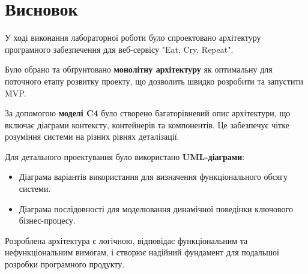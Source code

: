 \documentclass[12pt, a4paper]{article}
\begin{document}
\section{Висновок}

У ході виконання лабораторної роботи було спроектовано архітектуру програмного
забезпечення для веб-сервісу "Eat, Cry, Repeat".

Було обрано та обґрунтовано \textbf{монолітну архітектуру} як оптимальну для
поточного етапу розвитку проекту, що дозволить швидко розробити та запустити
MVP.

За допомогою \textbf{моделі C4} було створено багаторівневий опис архітектури,
що включає діаграми контексту, контейнерів та компонентів. Це забезпечує чітке
розуміння системи на різних рівнях деталізації.

Для детального проектування було використано \textbf{UML-діаграми}:
\begin{itemize}
    \item Діаграма варіантів використання для визначення
        функціонального обсягу системи.
    \item Діаграма послідовності для моделювання динамічної поведінки ключового
        бізнес-процесу.
\end{itemize}

Розроблена архітектура є логічною, відповідає функціональним та
нефункціональним вимогам, і створює надійний фундамент для подальшої розробки
програмного продукту.
\end{document}
